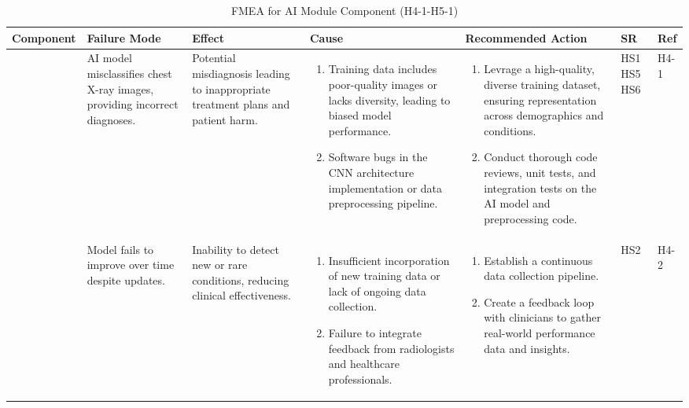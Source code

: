 \documentclass{article}
\begin{document}
\begin{landscape}
    \begin{table}[ht]
    \centering
    \caption{FMEA for AI Module Component (H4-1-H5-1)}
    \renewcommand{\arraystretch}{1.1}
    {
    \setlength{\tabcolsep}{2pt}
    \begin{tabular}{|p{2.5cm}|p{2.5cm}|p{3cm}|p{5cm}|p{6cm}|p{1cm}|p{1cm}|}
    \hline
    \textbf{Component} & \textbf{Failure Mode} & \textbf{Effect} & \textbf{Cause} & \textbf{Recommended Action} & \textbf{SR} & \textbf{Ref} \\
    \hline

    \multirow{2}{*}{} 
     & AI model misclassifies chest X-ray images, providing incorrect diagnoses.
     & Potential misdiagnosis leading to inappropriate treatment plans and patient harm.
     &
     \begin{enumerate}[leftmargin=*, label={\alph*.}, itemsep=1pt]
         \item Training data includes poor-quality images or lacks diversity, leading to biased model performance.
         \item Software bugs in the CNN architecture implementation or data preprocessing pipeline.
     \end{enumerate}
     &
     \begin{enumerate}[leftmargin=*, label={\alph*.}, itemsep=1pt]
         \item Levrage a high-quality, diverse training dataset, ensuring representation across demographics and conditions.
         \item Conduct thorough code reviews, unit tests, and integration tests on the AI model and preprocessing code.
     \end{enumerate}
     & HS1 \newline HS5 \newline HS6 & H4-1 \\ \cline{2-7}

    AI Module
     & Model fails to improve over time despite updates.
     & Inability to detect new or rare conditions, reducing clinical effectiveness.
     &
     \begin{enumerate}[leftmargin=*, label={\alph*.}, itemsep=1pt]
         \item Insufficient incorporation of new training data or lack of ongoing data collection.
         \item Failure to integrate feedback from radiologists and healthcare professionals.
     \end{enumerate}
     &
     \begin{enumerate}[leftmargin=*, label={\alph*.}, itemsep=1pt]
         \item Establish a continuous data collection pipeline.
         \item Create a feedback loop with clinicians to gather real-world performance data and insights.
     \end{enumerate}
     & HS2 & H4-2 \\ \hline


\end{tabular}}
\end{table}
\end{landscape}
\end{document}
